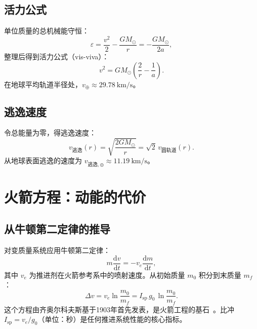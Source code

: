 \documentclass[12pt,a4paper]{article}
\newcommand{\dd}{\mathrm{d}}
\begin{document}
\subsection{活力公式}

单位质量的总机械能守恒：
\begin{equation}
  \varepsilon = \frac{v^2}{2} - \frac{GM_\odot}{r} = -\frac{GM_\odot}{2a},
\end{equation}
整理后得到活力公式（vis-viva）：
\begin{equation}
  \boxed{v^2 = GM_\odot\!\left(\frac{2}{r} - \frac{1}{a}\right).}
\end{equation}
在地球平均轨道半径处，$v_\oplus \approx \SI{29.78}{\kilo\meter\per\second}$。

\subsection{逃逸速度}

令总能量为零，得逃逸速度：
\begin{equation}
  v_{\mathrm{逃逸}}(r) = \sqrt{\frac{2GM_\odot}{r}} = \sqrt{2}\,v_{\mathrm{圆轨道}}(r).
\end{equation}
从地球表面逃逸的速度为 $v_{\mathrm{逃逸},\oplus} \approx \SI{11.19}{\kilo\meter\per\second}$。

\section{火箭方程：动能的代价}

\subsection{从牛顿第二定律的推导}

对变质量系统应用牛顿第二定律：
\begin{equation}
  m\frac{\dd v}{\dd t} = -v_e\frac{\dd m}{\dd t},
\end{equation}
其中 $v_e$ 为推进剂在火箭参考系中的喷射速度。从初始质量 $m_0$ 积分到末质量 $m_f$：
\begin{equation}
  \boxed{\Delta v = v_e \ln\!\frac{m_0}{m_f} = I_{\mathrm{sp}}\,g_0\,\ln\!\frac{m_0}{m_f}.}
  \label{eq:tsiolkovsky_zh}
\end{equation}
这个方程由齐奥尔科夫斯基于1903年首先发表，是火箭工程的基石~\citep{Tsiolkovsky1903}。比冲 $I_{\mathrm{sp}} = v_e/g_0$（单位：秒）是任何推进系统性能的核心指标。
\end{document}
